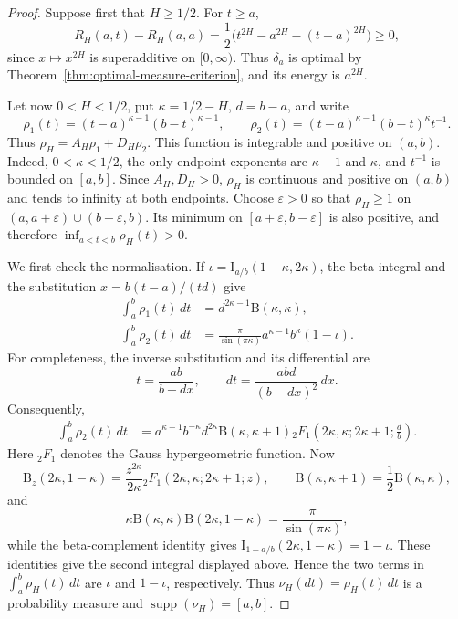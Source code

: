 \documentclass[11pt]{amsart}
\theoremstyle{definition}
\theoremstyle{remark}
\providecommand{\supp}{\operatorname{supp}}
\begin{document}
\begin{proof}
Suppose first that $H\geq1/2$.  For $t\geq a$,
\[
 R_H(a,t)-R_H(a,a)
 =\frac12\bigl(t^{2H}-a^{2H}-(t-a)^{2H}\bigr)\geq0,
\]
since $x\mapsto x^{2H}$ is superadditive on $[0,\infty)$.  Thus
$\delta_a$ is optimal by Theorem~\ref{thm:optimal-measure-criterion},
and its energy is $a^{2H}$.

Let now $0<H<1/2$, put $\kappa=1/2-H$, $d=b-a$, and write
\[
 \rho_1(t)=(t-a)^{\kappa-1}(b-t)^{\kappa-1},\qquad
 \rho_2(t)=(t-a)^{\kappa-1}(b-t)^{\kappa}t^{-1}.
\]
Thus $\rho_H=A_H\rho_1+D_H\rho_2$.  This function is integrable and positive
on $(a,b)$.  Indeed, $0<\kappa<1/2$, the only endpoint exponents are
$\kappa-1$ and $\kappa$, and $t^{-1}$ is bounded on $[a,b]$.  Since $A_H,D_H>0$,
$\rho_H$ is continuous and positive on $(a,b)$ and tends to infinity
at both endpoints.  Choose $\varepsilon>0$ so that $\rho_H\geq1$ on
$(a,a+\varepsilon)\cup(b-\varepsilon,b)$.  Its minimum on
$[a+\varepsilon,b-\varepsilon]$ is also positive, and therefore
$\inf_{a<t<b}\rho_H(t)>0$.

We first check the normalisation.  If
$\iota=\mathrm I_{a/b}(1-\kappa,2\kappa)$, the beta integral and the substitution
$x=b(t-a)/(td)$ give
\begin{align*}
 \int_a^b\rho_1(t)\,dt
 &=d^{2\kappa-1}\mathrm B(\kappa,\kappa),\\
 \int_a^b\rho_2(t)\,dt
 &=\frac{\pi}{\sin(\pi \kappa)}a^{\kappa-1}b^\kappa(1-\iota).
\end{align*}
For completeness, the inverse substitution and its differential are
\[
 t=\frac{ab}{b-dx},\qquad
 dt=\frac{abd}{(b-dx)^2}\,dx.
\]
Consequently,
\begin{align*}
 \int_a^b\rho_2(t)\,dt
 &=a^{\kappa-1}b^{-\kappa}d^{2\kappa}\mathrm B(\kappa,\kappa+1)
 {}_2F_1\left(2\kappa,\kappa;2\kappa+1;\frac db\right).
\end{align*}
Here ${}_2F_1$ denotes the Gauss hypergeometric function.
Now
\[
 \mathrm B_z(2\kappa,1-\kappa)
 =\frac{z^{2\kappa}}{2\kappa}{}_2F_1(2\kappa,\kappa;2\kappa+1;z),
 \qquad \mathrm B(\kappa,\kappa+1)=\frac12\mathrm B(\kappa,\kappa),
\]
and
\[
 \kappa\mathrm B(\kappa,\kappa)\mathrm B(2\kappa,1-\kappa)=\frac{\pi}{\sin(\pi \kappa)},
\]
while the beta-complement identity gives
$\mathrm I_{1-a/b}(2\kappa,1-\kappa)=1-\iota$.  These identities give the second
integral displayed above.  Hence the two terms in
$\int_a^b\rho_H(t)\,dt$ are $\iota$ and $1-\iota$, respectively.
Thus $\nu_H(dt)=\rho_H(t)\,dt$ is a probability measure and
$\supp(\nu_H)=[a,b]$.


\end{proof}
\end{document}
